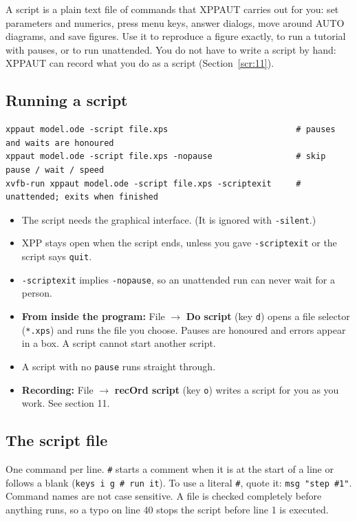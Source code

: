 \documentclass{article}
\providecommand{\tightlist}{\setlength{\itemsep}{0pt}\setlength{\parskip}{0pt}}
\begin{document}
A script is a plain text file of commands that XPPAUT carries out for
you: set parameters and numerics, press menu keys, answer dialogs, move
around AUTO diagrams, and save figures. Use it to reproduce a figure
exactly, to run a tutorial with pauses, or to run unattended. You do not
have to write a script by hand: XPPAUT can record what you do as a script
(Section~\ref{scr:11}).

\subsection{Running a script}\label{scr:1}

{\small\begin{verbatim}
xppaut model.ode -script file.xps                          # pauses and waits are honoured
xppaut model.ode -script file.xps -nopause                 # skip pause / wait / speed
xvfb-run xppaut model.ode -script file.xps -scriptexit     # unattended; exits when finished
\end{verbatim}}

\begin{itemize}
\tightlist
\item
  The script needs the graphical interface. (It is ignored with
  \texttt{-silent}.)
\item
  XPP stays open when the script ends, unless you gave
  \texttt{-scriptexit} or the script says \texttt{quit}.
\item
  \texttt{-scriptexit} implies \texttt{-nopause}, so an
  unattended run can never wait for a person.
\item
  \textbf{From inside the program:} File $\rightarrow$ \textbf{Do
  script} (key \texttt{d}) opens a file selector
  (\texttt{*.xps}) and runs the file you choose. Pauses are honoured
  and errors appear in a box. A script cannot start another script.
\item
  A script with no \texttt{pause} runs straight through.
\item
  \textbf{Recording:} File $\rightarrow$ \textbf{recOrd script}
  (key \texttt{o}) writes a script for you as you work. See section
  11.
\end{itemize}

\subsection{The script file}\label{scr:2}

One command per line. \texttt{\#} starts a comment when it is at
the start of a line or follows a blank
(\texttt{keys\ i\ g\ \#\ run\ it}). To use a literal \texttt{\#},
quote it: \texttt{msg\ "step\ \#1"}. Command names are not case
sensitive. A file is checked completely before anything runs, so a typo
on line 40 stops the script before line 1 is executed.
\end{document}
